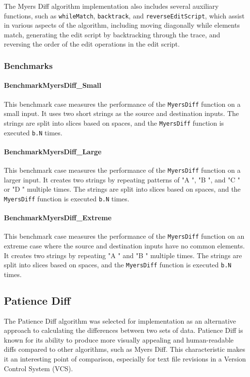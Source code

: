 The Myers Diff algorithm implementation also includes several auxiliary functions, such as \lstinline{whileMatch}, \lstinline{backtrack}, and \lstinline{reverseEditScript}, which assist in various aspects of the algorithm, including moving diagonally while elements match, generating the edit script by backtracking through the trace, and reversing the order of the edit operations in the edit script.

\subsubsection*{Benchmarks}

\paragraph{BenchmarkMyersDiff\_Small}
This benchmark case measures the performance of the \lstinline{MyersDiff} function on a small input. It uses two short strings as the source and destination inputs. The strings are split into slices based on spaces, and the \lstinline{MyersDiff} function is executed \lstinline{b.N} times.

\paragraph{BenchmarkMyersDiff\_Large}
This benchmark case measures the performance of the \lstinline{MyersDiff} function on a larger input. It creates two strings by repeating patterns of "A ", "B ", and "C " or "D " multiple times. The strings are split into slices based on spaces, and the \lstinline{MyersDiff} function is executed \lstinline{b.N} times.

\paragraph{BenchmarkMyersDiff\_Extreme}
This benchmark case measures the performance of the \lstinline{MyersDiff} function on an extreme case where the source and destination inputs have no common elements. It creates two strings by repeating "A " and "B " multiple times. The strings are split into slices based on spaces, and the \lstinline{MyersDiff} function is executed \lstinline{b.N} times.

\subsection{Patience Diff}
The Patience Diff algorithm was selected for implementation as an alternative approach to calculating the differences between two sets of data. Patience Diff is known for its ability to produce more visually appealing and human-readable diffs compared to other algorithms, such as Myers Diff. This characteristic makes it an interesting point of comparison, especially for text file revisions in a Version Control System (VCS).
\smallskip

